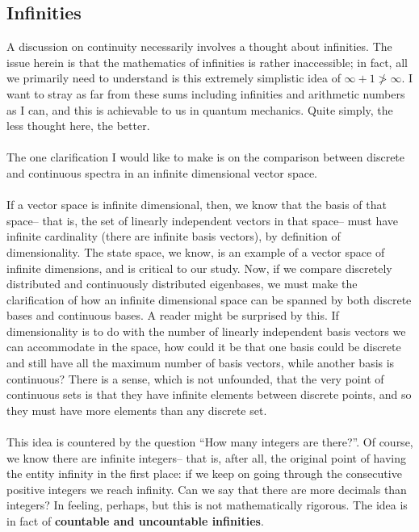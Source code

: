 \subsection{Infinities}
A discussion on continuity necessarily involves a thought about infinities. The issue herein is that the mathematics of infinities is rather inaccessible; in fact, all we primarily need to understand is this extremely simplistic idea of $\infty + 1 \ngtr \infty$. I want to stray as far from these sums including infinities and arithmetic numbers as I can, and this is achievable to us in quantum mechanics. Quite simply, the less thought here, the better.
\\\\
The one clarification I would like to make is on the comparison between discrete and continuous spectra in an infinite dimensional vector space.
\\\\
If a vector space is infinite dimensional, then, we know that the basis of that space-- that is, the set of linearly independent vectors in that space-- must have infinite cardinality (there are infinite basis vectors), by definition of dimensionality. The state space, we know, is an example of a vector space of infinite dimensions, and is critical to our study. Now, if we compare discretely distributed and continuously distributed eigenbases, we must make the clarification of how an infinite dimensional space can be spanned by both discrete bases and continuous bases. A reader might be surprised by this. If dimensionality is to do with the number of linearly independent basis vectors we can accommodate in the space, how could it be that one basis could be discrete and still have all the maximum number of basis vectors, while another basis is continuous? There is a sense, which is not unfounded, that the very point of continuous sets is that they have infinite elements between discrete points, and so they must have more elements than any discrete set.
\\\\
This idea is countered by the question ``How many integers are there?''. Of course, we know there are infinite integers-- that is, after all, the original point of having the entity infinity in the first place: if we keep on going through the consecutive positive integers we reach infinity. Can we say that there are more decimals than integers? In feeling, perhaps, but this is not mathematically rigorous. The idea is in fact of \textbf{countable and uncountable infinities}.
\\\\
